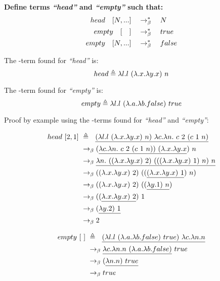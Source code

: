 \documentclass{article}
\begin{document}
	\begin{Large}
	
		\textbf{Define terms \textit{``head''} and \textit{``empty''} such that:}
		\begin{align*}
			head \quad [ N, ...] &\quad \rightarrow_\beta^*\quad  N\\
			empty \quad [\quad] &\quad \rightarrow_\beta^*\quad true\\
			empty \quad [ N, ...] &\quad \rightarrow_\beta^*\quad false
		\end{align*}
		\newline
		
		The \lamb -term found for \textit{``head''} is:
		\begin{equation*}
			head \triangleq \la l.l \ (\la .x.\la y.x) \ n
		\end{equation*}
		\newline
		
		The \lamb -term found for \textit{``empty''} is:
		\begin{equation*}
			empty \triangleq \la l.l \ (\la .a.\la b.false) \ true
		\end{equation*}
		\newline
		
		Proof by example using the \lamb -terms found for  \textit{``head''} and \textit{``empty''}:
		
		\begin{align*}
			head \ [2,1] \ &\triangleq \saq \underline{(\la l.l \ (\la .x.\la y.x) \ n) \ \la c.\la n. \ c \ 2 \ (c \ 1 \ n)} \\
			&\equals (\underline{\la c.\la n. \ c \ 2 \ (c \ 1 \ n)) \ (\la .x.\la y.x}) \ n \\
			&\equals \underline{\la n.\ ((\la .x.\la y.x) \ 2) \ (((\la .x.\la y.x) \ 1) \ n) \ n} \\
			&\equals ((\la .x.\la y.x) \ 2) \ ((\underline{(\la .x.\la y.x) \ 1}) \ n) \\
			&\equals ((\la .x.\la y.x) \ 2) \ ((\underline{\la y.1 ) \ n}) \\
			&\equals ((\underline{\la .x.\la y.x) \ 2}) \ 1 \\
			&\equals (\underline{\la y.2) \ 1} \\
			&\equals 2
		\end{align*}
		
		\begin{align*}
			empty \ [ \ ] \ &\triangleq \saq \underline{(\la l.l \ (\la .a.\la b.false) \ true) \ \la c.\la n.n} \\
			&\equals \underline{\la c.\la n.n \ (\la .a.\la b.false)} \ true \\
			&\equals (\underline{\la n.n) \ true} \\
			&\equals true
		\end{align*}
		

\end{Large}
\end{document}
